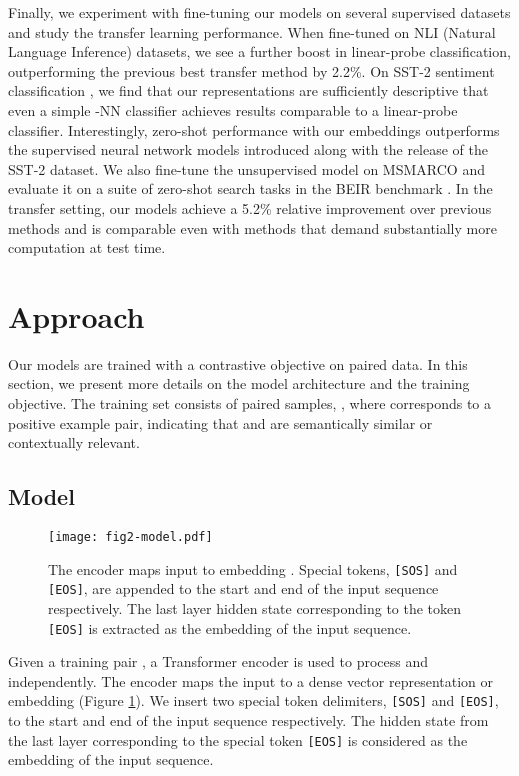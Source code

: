 \documentclass[nohyperref]{article}
\begin{document}
Finally, we experiment with fine-tuning our models on several supervised datasets and study the transfer learning performance. When fine-tuned on NLI (Natural Language Inference) datasets, we see a further boost in linear-probe classification, outperforming the previous best transfer method \cite{simcse} by 2.2\%. On SST-2 sentiment classification \cite{sst}, we find that our representations are sufficiently descriptive that even a simple -NN classifier achieves results comparable to a linear-probe classifier. Interestingly, zero-shot performance with our embeddings outperforms the supervised neural network models introduced along with the release of the SST-2 dataset.  We also fine-tune the unsupervised model on MSMARCO and evaluate it on a suite of zero-shot search tasks in the BEIR benchmark \cite{beir}. In the transfer setting, our models achieve a 5.2\% relative improvement over previous methods \cite{contreiver} and is comparable even with methods \cite{colbert,splade,mini} that demand substantially more computation at test time.


\section{Approach}
\label{sec:approach}

Our models are trained with a contrastive objective on paired data. In this section, we present more details on the model architecture and the training objective. The training set consists of paired samples, , where  corresponds to a positive example pair, indicating that  and  are semantically similar or contextually relevant.

\subsection{Model}
\label{sec:model}

\begin{figure}[h]
\centering
\texttt{[image: fig2-model.pdf]}
\caption{The encoder  maps input  to embedding . Special tokens, \texttt{[SOS]} and \texttt{[EOS]}, are appended to the start and end of the input sequence respectively. The last layer hidden state corresponding to the token \texttt{[EOS]} is extracted as the embedding of the input sequence.}
\label{fig:model}
\end{figure}

Given a training pair , a Transformer \cite{transformer} encoder  is used to process  and  independently. The encoder maps the input to a dense vector representation or embedding (Figure \ref{fig:model}). We insert two special token delimiters, \texttt{[SOS]} and \texttt{[EOS]}, to the start and end of the input sequence respectively. The hidden state from the last layer corresponding to the special token \texttt{[EOS]} is considered as the embedding of the input sequence.
\end{document}
